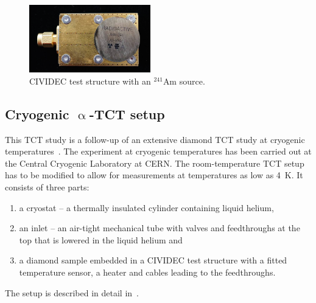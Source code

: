
\begin{figure}[!t]
\begin{center}
\includegraphics[width=0.47\textwidth]{03_measurement_results/pics/setup/cividec-test-structure2}
\caption{CIVIDEC test structure with an $^{241}$Am source.}
\label{fig:carrier}
\end{center}
\end{figure}


\subsection{Cryogenic $\upalpha$-TCT setup}
\label{sec:cryosetup}
This TCT study is a follow-up of an extensive diamond TCT study at cryogenic temperatures~\cite{Jansen:1956431}. The experiment at cryogenic temperatures has been carried out at the Central Cryogenic Laboratory at CERN. The room-temperature TCT setup has to be modified to allow for measurements at temperatures as low as 4~K. It consists of three parts: 
\begin{enumerate}
\item a cryostat --  a thermally insulated cylinder containing liquid helium,
\item an inlet -- an air-tight mechanical tube with valves and feedthroughs at the top that is lowered in the liquid helium and
\item a diamond sample embedded in a CIVIDEC test structure with a fitted temperature sensor, a heater and cables leading to the feedthroughs.
\end{enumerate}
The setup is described in detail in~\cite{Jansen:1956431}.

